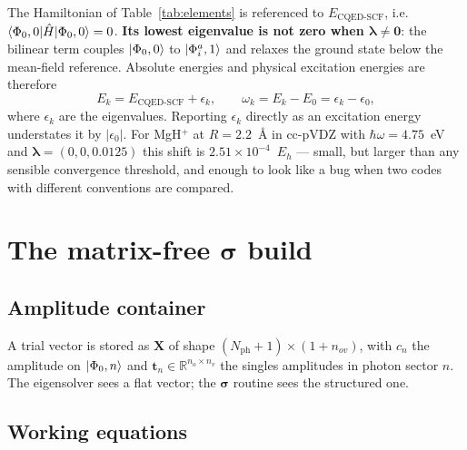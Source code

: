 \documentclass[11pt]{article}
\newcommand{\lam}{\bm{\lambda}}
\newcommand{\Ecqed}{E_{\mathrm{CQED\text{-}SCF}}}
\newcommand{\nph}{N_{\mathrm{ph}}}
\newcommand{\nov}{n_{ov}}
\newcommand{\nocc}{n_{o}}
\newcommand{\nvir}{n_{v}}
\begin{document}
The Hamiltonian of Table~\ref{tab:elements} is referenced to $\Ecqed$, i.e.\
$\braket{\Phi_0,0|\hat{H}|\Phi_0,0} = 0$. \textbf{Its lowest eigenvalue is not
zero when $\lam \ne \bm{0}$}: the bilinear term couples $\ket{\Phi_0,0}$ to
$\ket{\Phi_i^a,1}$ and relaxes the ground state below the mean-field reference.
Absolute energies and physical excitation energies are therefore
\begin{equation}
E_k = \Ecqed + \epsilon_k,
\qquad
\omega_k = E_k - E_0 = \epsilon_k - \epsilon_0 ,
\label{eq:zero}
\end{equation}
where $\epsilon_k$ are the eigenvalues. Reporting $\epsilon_k$ directly as an
excitation energy understates it by $|\epsilon_0|$. For MgH$^+$ at
$R = 2.2$~\AA{} in cc-pVDZ with $\hbar\omega = 4.75$~eV and
$\lam = (0,0,0.0125)$ this shift is $2.51\times10^{-4}$~$E_h$ --- small, but
larger than any sensible convergence threshold, and enough to look like a bug
when two codes with different conventions are compared.

\section{The matrix-free \texorpdfstring{$\bm{\sigma}$}{sigma} build}
\label{sec:sigma}

\subsection{Amplitude container}

A trial vector is stored as $\bm{X}$ of shape $(\nph+1) \times (1+\nov)$, with
$c_n$ the amplitude on $\ket{\Phi_0,n}$ and $\bm{t}_n \in \mathbb{R}^{\nocc \times \nvir}$
the singles amplitudes in photon sector $n$. The eigensolver sees a flat vector;
the $\bm{\sigma}$ routine sees the structured one.

\subsection{Working equations}
\end{document}
